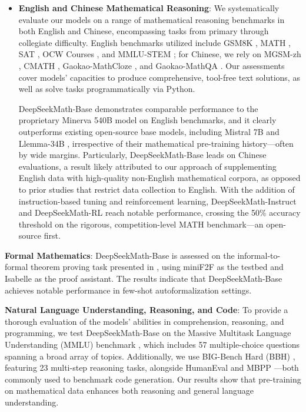 \begin{itemize}[topsep=0pt]
    \item \textbf{English and Chinese Mathematical Reasoning}: We systematically evaluate our models on a range of mathematical reasoning benchmarks in both English and Chinese, encompassing tasks from primary through collegiate difficulty. English benchmarks utilized include GSM8K \citep{gsm8k}, MATH \citep{MATH}, SAT \citep{llemma}, OCW Courses \citep{minerva}, and MMLU-STEM \citep{mmlu}; for Chinese, we rely on MGSM-zh \citep{mgsm}, CMATH \citep{wei2023cmath}, Gaokao-MathCloze \citep{agieval}, and Gaokao-MathQA \citep{agieval}. Our assessments cover models’ capacities to produce comprehensive, tool-free text solutions, as well as solve tasks programmatically via Python.

    DeepSeekMath-Base demonstrates comparable performance to the proprietary Minerva 540B \citep{minerva} model on English benchmarks, and it clearly outperforms existing open-source base models, including Mistral 7B \citep{mistral} and Llemma-34B \citep{llemma}, irrespective of their mathematical pre-training history—often by wide margins. Particularly, DeepSeekMath-Base leads on Chinese evaluations, a result likely attributed to our approach of supplementing English data with high-quality non-English mathematical corpora, as opposed to prior studies \citep{minerva,llemma} that restrict data collection to English. With the addition of instruction-based tuning and reinforcement learning, DeepSeekMath-Instruct and DeepSeekMath-RL reach notable performance, crossing the 50\% accuracy threshold on the rigorous, competition-level MATH benchmark—an open-source first.
\end{itemize}

\item \textbf{Formal Mathematics}: DeepSeekMath-Base is assessed on the informal-to-formal theorem proving task presented in \citep{dsp_proof}, using miniF2F \citep{minif2f} as the testbed and Isabelle \citep{isabelle} as the proof assistant. The results indicate that DeepSeekMath-Base achieves notable performance in few-shot autoformalization settings.
\item \textbf{Natural Language Understanding, Reasoning, and Code}: To provide a thorough evaluation of the models’ abilities in comprehension, reasoning, and programming, we test DeepSeekMath-Base on the Massive Multitask Language Understanding (MMLU) benchmark \citep{mmlu}, which includes 57 multiple-choice questions spanning a broad array of topics. Additionally, we use BIG-Bench Hard (BBH) \citep{bbh}, featuring 23 multi-step reasoning tasks, alongside HumanEval \citep{codex} and MBPP \citep{mbpp}—both commonly used to benchmark code generation. Our results show that pre-training on mathematical data enhances both reasoning and general language understanding.

